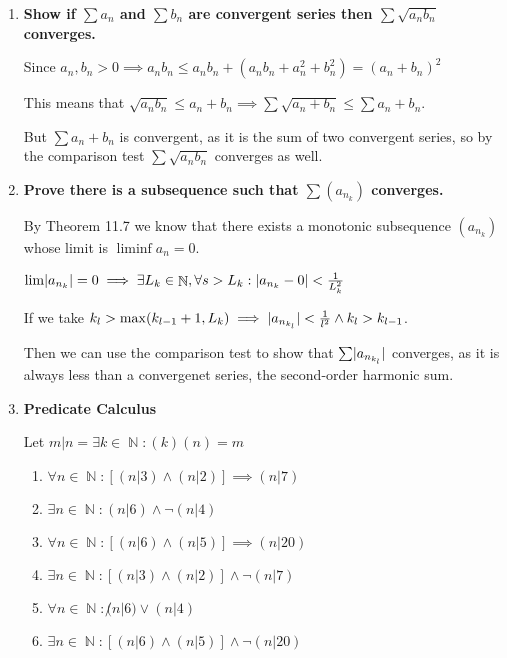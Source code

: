 \documentclass[10pt,a4paper]{article}
\DeclareMathOperator*{\N}{\mathbb{N}}
\DeclarePairedDelimiter{\abs}{\lvert}{\rvert}
\begin{document}
\begin{enumerate}
    \item \textbf{Show if $\sum a_n$ and $\sum b_n$ are convergent series then $\sum \sqrt{a_n b_n}$ converges.}

        Since $a_n, b_n > 0 \implies a_n b_n \leq a_nb_n + (a_nb_n + a_n^2 + b_n^2) = (a_n + b_n)^2$

        This means that $\sqrt{a_n b_n} \leq a_n +b_n \implies \sum \sqrt{a_n + b_n} \leq \sum a_n + b_n$.

        But $\sum a_n +b_n$ is convergent, as it is the sum of two convergent series, so by the comparison test  $\sum \sqrt{a_n b_n}$ converges as well.

    \item \textbf{Prove there is a subsequence such that $\sum (a_{n_k})$ converges.}

        By Theorem 11.7 we know that there exists a monotonic subsequence $(a_{n_k})$ whose limit is $\liminf a_n = 0$.

        $\lim \abs{a_{n_k}} = 0 \implies \exists L_k \in \N, \forall s > L_k : \abs{a_{n_k} - 0} < \frac{1}{L_k^2}$

        If we take $k_l > \max(k_{l-1}+1, L_k) \implies \abs{a_{n_{k_l}}} < \frac{1}{l^2} \land k_l > k_{l-1}$. 
        
        Then we can use the comparison test to show that $\sum \abs{a_{n_{k_l}}}$ converges, as it is always less than a convergenet series, the second-order harmonic sum.


    \item \textbf{Predicate Calculus}

        Let $m\vert n = \exists k \in \N: (k)(n) = m$

        \begin{enumerate}
            \item $\forall n \in \N  : [(n \vert 3 ) \land (n \vert 2)] \implies (n \vert 7)$
            \item $\exists n \in \N  : (n \vert 6 ) \land \lnot (n \vert 4) $
            \item $\forall n \in \N  : [(n \vert 6 ) \land (n \vert 5)] \implies (n \vert 20)$
            \item $\exists n \in \N  : [(n \vert 3 ) \land (n \vert 2)] \land \lnot (n \vert 7)$
            \item $\forall n \in \N  : \not (n \vert 6 ) \lor (n \vert 4) $
            \item $\exists n \in \N  : [(n \vert 6 ) \land (n \vert 5)] \land \lnot (n \vert 20)$
        \end{enumerate}

\end{enumerate}
\end{document}
